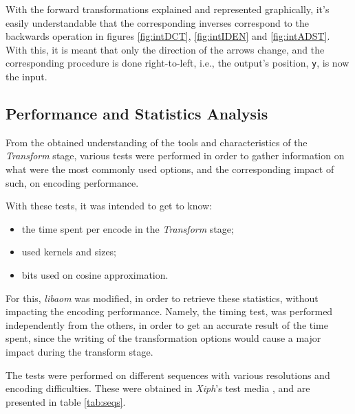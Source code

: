 With the forward transformations explained and represented graphically, it's easily understandable that the corresponding inverses correspond to the backwards operation in figures \ref{fig:intDCT}, \ref{fig:intIDEN} and \ref{fig:intADST}. With this, it is meant that only the direction of the arrows change, and the corresponding procedure is done right-to-left, i.e., the output's position, \texttt{y}, is now the input.

\subsection{Performance and Statistics Analysis}

From the obtained understanding of the tools and characteristics of the \emph{Transform} stage, various tests were performed in order to gather information on what were the most commonly used options, and the corresponding impact of such, on encoding performance.

With these tests, it was intended to get to know:
\begin{itemize}
    \item the time spent per encode in the \emph{Transform} stage;
    \item used kernels and sizes;
    \item bits used on cosine approximation.
\end{itemize}

For this, \emph{libaom} was modified, in order to retrieve these statistics, without impacting the encoding performance. Namely, the timing test, was performed independently from the others, in order to get an accurate result of the time spent, since the writing of the transformation options would cause a major impact during the transform stage.

The tests were performed on different sequences with various resolutions and encoding difficulties. These were obtained in \emph{Xiph}'s test media \cite{XiphOrgTest}, and are presented in table \ref{tab:seqs}.

